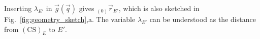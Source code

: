 \documentclass[graybox,vecphys]{svmult}
\newcommand{\ks}[1]{{(\mathrm{CS})_{#1}}}
\begin{document}

Inserting ${\lambda_{E'}}$ in $\vec{g}(\vec{q})$ gives ${_{(0)}\vec{r}_{E'}}$, which is also sketched in Fig.~\ref{fig:geometry_sketch},a.
The variable ${\lambda_{E'}}$ can be understood as the distance from $\ks{E}$ to $E'$. %
\end{document}
